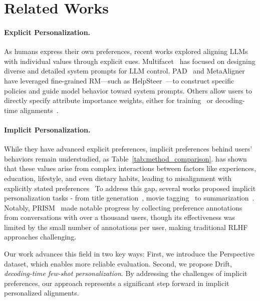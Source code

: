 \section{Related Works}
\paragraph{Explicit Personalization.}
As humans express their own preferences, recent works explored aligning LLMs with individual values through explicit cues. Multifacet~\citep{multifacet} has focused on designing diverse and detailed system prompts for LLM control. PAD~\citep{chen2024pad} and MetaAligner~\citep{yang2024metaaligner} have leveraged fine-grained RM—such as HelpSteer~\citep{helpsteer}—to construct specific policies and guide model behavior toward system prompts. Others allow users to directly specify attribute importance weights, either for training~\citep{yang2024rewards, DPA} or decoding-time alignments~\citep{dekoninck2023controlled, shi2406decoding}. 

\paragraph{Implicit Personalization.}
While they have advanced explicit preferences, implicit preferences behind users' behaviors remain understudied, as Table~\ref{tab:method_comparison}. \citet{jin2024implicit} has shown that these values arise from complex interactions between factors like experiences, education, lifestyle, and even dietary habits, leading to misalignment with explicitly stated preferences~\citep{nisbett1977telling}
To address this gap, several works proposed implicit personalization tasks - from title generation~\citep{ao-etal-2021-pens}, movie tagging~\citep{salemi2023lamp} to summarization~\citep{zhang2024personalsum}.
Notably, PRISM~\citep{kirk2024prism} made notable progress by collecting preference annotations from conversations with over a thousand users, though its effectiveness was limited by the small number of annotations per user, making traditional RLHF approaches challenging.

Our work advances this field in two key ways: First, we introduce the Perspective dataset, which enables more reliable evaluation. Second, we propose Drift, \textit{decoding-time few-shot personalization}. 
By addressing the challenges of implicit preferences, our approach represents a significant step forward in implicit personalized alignments.
